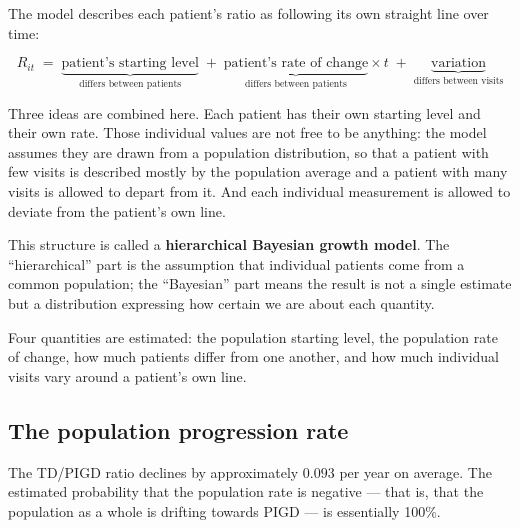 \documentclass[11pt,a4paper]{article}
\begin{document}
The model describes each patient's ratio as following its own straight line over
time:

\[
  R_{it} \;=\; \underbrace{\text{patient's starting level}}_{\text{differs between patients}}
  \;+\; \underbrace{\text{patient's rate of change}}_{\text{differs between patients}} \times t
  \;+\; \underbrace{\text{variation}}_{\text{differs between visits}}
\]

Three ideas are combined here. Each patient has their own starting level and
their own rate. Those individual values are not free to be anything: the model
assumes they are drawn from a population distribution, so that a patient with
few visits is described mostly by the population average and a patient with many
visits is allowed to depart from it. And each individual measurement is allowed
to deviate from the patient's own line.

This structure is called a \textbf{hierarchical Bayesian growth model}. The
``hierarchical'' part is the assumption that individual patients come from a
common population; the ``Bayesian'' part means the result is not a single
estimate but a distribution expressing how certain we are about each quantity.

Four quantities are estimated: the population starting level, the population
rate of change, how much patients differ from one another, and how much
individual visits vary around a patient's own line.

\subsection{The population progression rate}

\begin{center}
\end{center}

\vspace{6pt}
\noindent
The TD/PIGD ratio declines by approximately $0.093$ per year on average. The
estimated probability that the population rate is negative --- that is, that the
population as a whole is drifting towards PIGD --- is essentially 100\%.
\end{document}
